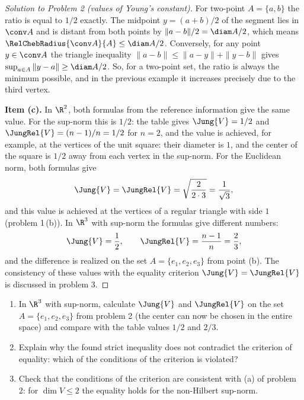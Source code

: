\documentclass[a4paper,12pt]{report}
\begin{document}
\begin{proof}[Solution to Problem \textup{2} \textup{(}values of Young's constant\textup{)}]
For two-point $A = \{a,b\}$ the ratio is equal to $1/2$ exactly. The midpoint $y = (a+b)/2$ of the segment lies in $\conv A$ and is distant from both points by $\|a-b\|/2 = \diam A/2$, which means $\RelChebRadius{\conv A}{A} \le \diam A/2$. Conversely, for any point $y \in \conv A$ the triangle inequality $\|a - b\| \le \|a - y\| + \|y - b\|$ gives $\sup_{a \in A} \|y - a\| \ge \diam A/2$. So, for a two-point set, the ratio is always the minimum possible, and in the previous example it increases precisely due to the third vertex.

\textbf{Item \textup{(c)}.} In $\R^2$, both formulas from the reference information give the same value. For the sup-norm this is $1/2$: the table gives $\Jung{V} = 1/2$ and $\JungRel{V} = (n-1)/n = 1/2$ for $n = 2$, and the value is achieved, for example, at the vertices of the unit square: their diameter is $1$, and the center of the square is $1/2$ away from each vertex in the sup-norm. For the Euclidean norm, both formulas give
\[
\Jung{V} = \JungRel{V} = \sqrt{\frac{2}{2 \cdot 3}} = \frac{1}{\sqrt3},
\]
and this value is achieved at the vertices of a regular triangle with side $1$ \textup{(}problem \textup{1}\,\textup{(b)}\textup{)}. In $\R^3$ with sup-norm the formulas give different numbers:
\[
\Jung{V} = \frac12, \qquad \JungRel{V} = \frac{n-1}{n} = \frac23,
\]
and the difference is realized on the set $A = \{e_1, e_2, e_3\}$ from point \textup{(b)}. The consistency of these values with the equality criterion $\Jung{V} = \JungRel{V}$ is discussed in problem \textup{3}.

\end{proof}

\begin{task}[equality criterion $J(V) = J_s(V)$]
\begin{enumerate}[label=\textup{(\alph*)}]
\item In $\R^3$ with sup-norm, calculate $\Jung{V}$ and $\JungRel{V}$ on the set $A = \{e_1, e_2, e_3\}$ from problem \textup{2} \textup{(}the center can now be chosen in the entire space\textup{)} and compare with the table values $1/2$ and $2/3$.
\item Explain why the found strict inequality does not contradict the criterion of equality\textup{:} which of the conditions of the criterion is violated?
\item Check that the conditions of the criterion are consistent with \textup{(a)} of problem \textup{2}\textup{:} for $\dim V \le 2$ the equality holds for the non-Hilbert sup-norm.
\end{enumerate}

\end{task}
\end{document}
